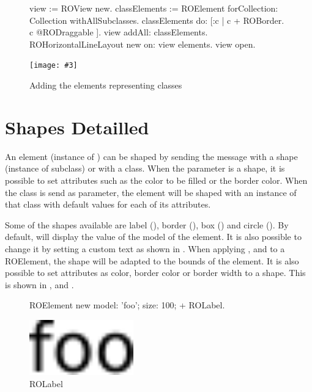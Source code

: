 \documentclass[a4paper,10pt,twoside]{book}
\newcommand{\fig}[4]{
		\begin{figure}[#1]
			\centering
			\texttt{[image: \#3]}
			\caption{\label{fig:#3}#4}
		\end{figure}}
\begin{document}
\begin{figure}[H]
\begin{code}{}
view := ROView new.
classElements := ROElement forCollection: Collection withAllSubclasses.
classElements 
	do: [:c | c + ROBorder.
			c @RODraggable ].
view addAll: classElements.
ROHorizontalLineLayout new on: view elements.
view open.
\end{code}
\end{figure}

\fig{H}{0.6}{hier1}{Adding the elements representing classes}


\section{Shapes Detailled} 

An element (instance of ) can be shaped by sending the \ct{+} message with a shape (instance of  subclass) or with a  class. 
When the parameter is a shape, it is possible to set attributes such as the color to be filled or the border color. When the class is send as parameter, the element will be shaped with an instance of that class with default values for each of its attributes.

Some of the shapes available are label (), border (), box () and circle (). By default,  will display the  value of the model of the element. It is also possible to change it by setting a custom text as shown in . When applying ,  and  to a ROElement, the shape will be adapted to the bounds of the element. It is also possible to set attributes as color, border color or border width to a shape. This is shown in ,  and .

\begin{figure}[H]
      \begin{minipage}[t]{0.5\textwidth}
      \vspace{0pt}
	     \begin{code}[!]
     
	ROElement new
		model: 'foo';
		size: 100; 
		+ ROLabel.	\end{code}
   \end{minipage}
   \hfill
   \begin{minipage}[t]{0.4\textwidth}
      \vspace{0pt} \raggedright
       \centering
		\includegraphics[width=0.4\textwidth]{label}
   \end{minipage}
\caption{ROLabel}
\label{fig:label}
\end{figure}
\end{document}
